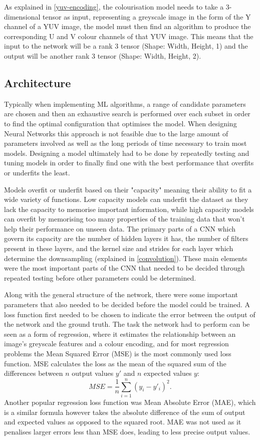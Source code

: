 \documentclass{l4proj}
\begin{document}
As explained in \ref{yuv-encoding}, the colourisation model needs to take a 3-dimensional tensor as input, representing a greyscale image in the form of the Y channel of a YUV image, the model must then find an algorithm to produce the corresponding U and V colour channels of that YUV image. This means that the input to the network will be a rank 3 tensor (Shape: Width, Height, 1) and the output will be another rank 3 tensor (Shape: Width, Height, 2).

\subsection{Architecture}
Typically when implementing ML algorithms, a range of candidate parameters are chosen and then an exhaustive search is performed over each subset in order to find the optimal configuration that optimises the model. When designing Neural Networks this approach is not feasible due to the large amount of parameters involved as well as the long periods of time necessary to train most models. Designing a model ultimately had to be done by repeatedly testing and tuning models in order to finally find one with the best performance that overfits or underfits the least.

Models overfit or underfit based on their "capacity" meaning their ability to fit a wide variety of functions. Low capacity models can underfit the dataset as they lack the capacity to memorise important information, while high capacity models can overfit by memorising too many properties of the training data that won't help their performance on unseen data\cite[p.110]{Goodfellow}. The primary parts of a CNN which govern its capacity are the number of hidden layers it has, the number of filters present in these layers, and the kernel size and strides for each layer which determine the downsampling (explained in \ref{convolution}). These main elements were the most important parts of the CNN that needed to be decided through repeated testing before other parameters could be determined.

Along with the general structure of the network, there were some important parameters that also needed to be decided before the model could be trained. A loss function first needed to be chosen to indicate the error between the output of the network and the ground truth. The task the network had to perform can be seen as a form of regression, where it estimates the relationship between an image's greyscale features and a colour encoding, and for most regression problems the  Mean Squared Error (MSE) is the most commonly used loss function. MSE calculates the loss as the mean of the squared sum of the differences between $n$ output values $y'$ and $n$ expected values $y$: 
\begin{equation}
    MSE = \frac{1}{n}\sum_{i=1}^{n} (y_i - y'_i)^2.
\end{equation}
Another popular regression loss function was Mean Absolute Error (MAE), which is a similar formula however takes the absolute difference of the sum of output and expected values as opposed to the squared root. MAE was not used as it penalises larger errors less than MSE does, leading to less precise output values.
\end{document}
